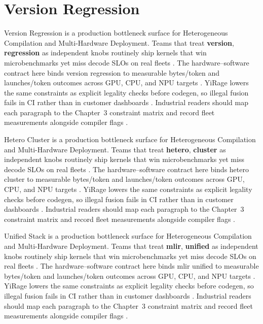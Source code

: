 \section{Version Regression}
\label{sec:version_regression}

Version Regression is a production bottleneck surface for Heterogeneous Compilation and Multi-Hardware Deployment. Teams that treat \textbf{version}, \textbf{regression} as independent knobs routinely ship kernels that win microbenchmarks yet miss decode SLOs on real fleets \citep{nvidia2022hopper,amd2024aie}. The hardware--software contract here binds version regression to measurable bytes/token and launches/token outcomes across GPU, CPU, and NPU targets \citep{semianalysis2024tma,dlbook}. YiRage lowers the same constraints as explicit legality checks before codegen, so illegal fusion fails in CI rather than in customer dashboards \citep{amd2024xdna,dao2022flashattention}. Industrial readers should map each paragraph to the Chapter~3 constraint matrix and record fleet measurements alongside compiler flags \citep{amd2024aie,kwon2023vllm}.

Hetero Cluster is a production bottleneck surface for Heterogeneous Compilation and Multi-Hardware Deployment. Teams that treat \textbf{hetero}, \textbf{cluster} as independent knobs routinely ship kernels that win microbenchmarks yet miss decode SLOs on real fleets \citep{taxbreak2026,semianalysis2024tma}. The hardware--software contract here binds hetero cluster to measurable bytes/token and launches/token outcomes across GPU, CPU, and NPU targets \citep{memoryfloor2026,amd2024xdna}. YiRage lowers the same constraints as explicit legality checks before codegen, so illegal fusion fails in CI rather than in customer dashboards \citep{nvidia2022hopper,amd2024aie}. Industrial readers should map each paragraph to the Chapter~3 constraint matrix and record fleet measurements alongside compiler flags \citep{semianalysis2024tma,dlbook}.

Unified Stack is a production bottleneck surface for Heterogeneous Compilation and Multi-Hardware Deployment. Teams that treat \textbf{mlir}, \textbf{unified} as independent knobs routinely ship kernels that win microbenchmarks yet miss decode SLOs on real fleets \citep{memoryfloor2026,amd2024xdna}. The hardware--software contract here binds mlir unified to measurable bytes/token and launches/token outcomes across GPU, CPU, and NPU targets \citep{nvidia2022hopper,amd2024aie}. YiRage lowers the same constraints as explicit legality checks before codegen, so illegal fusion fails in CI rather than in customer dashboards \citep{semianalysis2024tma,dlbook}. Industrial readers should map each paragraph to the Chapter~3 constraint matrix and record fleet measurements alongside compiler flags \citep{amd2024xdna,dao2022flashattention}.

